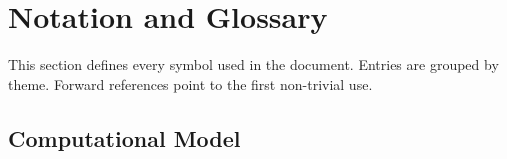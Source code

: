 \documentclass[11pt]{article}
\begin{document}
\newpage

\section*{Notation and Glossary}

This section defines every symbol used in the document. Entries are
grouped by theme. Forward references point to the first non-trivial use.

\subsection*{Computational Model}
\end{document}
